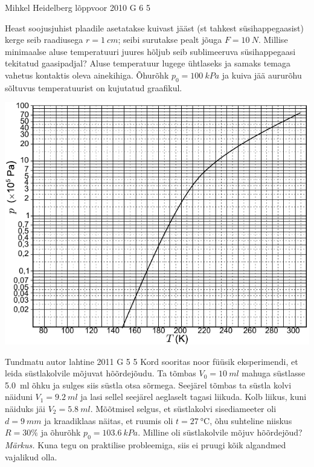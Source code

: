 \documentclass[11pt]{article}
\begin{document}
{%
{Mihkel Heidelberg} %
{lõppvoor} %
{2010} %
{G 6} %
{5} %
{
\ifStatement
Heast soojusjuhist plaadile asetatakse kuivast jääst (st tahkest
süsihappegaasist) kerge seib raadiusega $r=\SI{1}{cm}$; seibi surutakse
pealt jõuga $F=\SI{10}{N}$. Millise minimaalse aluse
temperatuuri juures hõljub seib sublimeeruva süsihappegaasi tekitatud
gaasipadjal? Aluse temperatuur lugege ühtlaseks ja samaks temaga
vahetus kontaktis oleva ainekihiga. Õhurõhk $p_{0}=\SI{100}{kPa}$
ja kuiva jää aururõhu sõltuvus temperatuurist on kujutatud graafikul.

\begin{center}
	\includegraphics{2010-v3g-06-Aururohk}
\end{center}
\fi
}

{Tundmatu autor} %
{lahtine} %
{2011} %
{G 5} %
{5} %
{
\ifStatement
Kord sooritas noor füüsik eksperimendi, et leida süstlakolvile mõjuvat
hõõrdejõudu. Ta tõmbas $V_{0}=\SI{10}{ml}$ mahuga süstlasse \SI{5,0}{ml} õhku ja sulges siis
süstla otsa sõrmega. Seejärel tõmbas ta süstla kolvi näiduni
$V_{1}=\SI{9,2}{ml}$ ja
lasi sellel seejärel aeglaselt tagasi liikuda. Kolb liikus, kuni näiduks jäi $V_{2}=\SI{5,8}{ml}$.
Mõõtmisel selgus, et süstlakolvi sisediameeter oli $d=\SI{9}{mm}$ ja kraadiklaas
näitas, et ruumis oli $t=\SI{27}{\celsius}$, õhu suhteline niiskus $R=30\%$ ja õhurõhk
$p_{0}=\SI{103,6}{kPa}$. Milline oli süstlakolvile mõjuv hõõrdejõud?\\
\textit{Märkus.} Kuna tegu on praktilise probleemiga, siis ei pruugi kõik
algandmed vajalikud olla.
\fi
}

}
\end{document}
